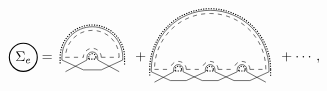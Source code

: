 \documentclass[aps,pra,groupedaddress,twocolumn,notitlepage,superscriptaddress,10pt]{revtex4-1}
\begin{document}
\begin{align}
\tikz[baseline=-0.5ex]{
    \draw[thick] (0,0) circle (10pt) node[anchor=center] {$\Sigma_e$};
    }
=& \ \,
\tikz[scale=0.45,baseline=-0.5ex]{
    \draw[dashed] (0,0) -- (1,0);
    \draw (-0.2,0.)-- (-0.2,-0.15);
    \draw (-0.2,-0.15)-- (1.,-0.7);
    \draw (1.2,-0.15)-- (1.2,0.0);
    \draw (1.2,-0.15)-- (0,-0.8);
    \draw[densely dotted,thick] (-0.3,0.)-- (-0.3,-0.4);
    \draw[densely dotted,thick] (1.3,-0.1)-- (1.3,0.);
    \draw[dashed] (2,0) -- (3,0);
    \draw (1.8,0.)-- (1.8,-0.15);
    \draw (1.8,-0.15)-- (3.,-0.8);
    \draw (3.2,-0.15)-- (3.2,0.);
    \draw (3.2,-0.15)-- (2,-0.7);
    \draw[densely dotted,thick] (1.7,0.)-- (1.7,-0.1);
    \draw[densely dotted,thick] (3.3,-0.4)-- (3.3,0.);
    \draw[densely dotted,thick] (1.3,-0.1)--(1.7,-0.1);
    \draw (1.0,-0.7)-- (2,-0.7);
    \draw[densely dotted,thick] (3.3,0) arc (0:180:1.8);
    \draw[densely dotted,thick] (1.7,0) arc (0:180:0.2);
    \draw[dashed] (2.0,0) arc (0:180:0.5);
    \draw[dashed] (3.0,0) arc (0:180:1.5);
    \draw (1.8,0) arc (0:180:0.3);
    \draw (3.2,0) arc (0:180:1.7);
 }
\ \,
+
\tikz[scale=0.4,baseline=1.5ex]{
    \draw[dashed] (0,0) -- (1,0);
    \draw (-0.2,0.)-- (-0.2,-0.15);
    \draw (-0.2,-0.15)-- (1.,-0.7);
    \draw (1.2,-0.15)-- (1.2,0.0);
    \draw (1.2,-0.15)-- (0,-0.8);
    \draw[densely dotted,thick] (-0.3,0.)-- (-0.3,-0.4);
    \draw[densely dotted,thick] (1.3,-0.1)-- (1.3,0.);
    \draw[dashed] (2,0) -- (3,0);
    \draw (1.8,0.)-- (1.8,-0.15);
    \draw (1.8,-0.15)-- (3.,-0.7);
    \draw (3.2,-0.15)-- (3.2,0.);
    \draw (3.2,-0.15)-- (2,-0.7);
    \draw[densely dotted,thick] (1.7,0.)-- (1.7,-0.1);
    \draw[densely dotted,thick] (3.3,-0.1)-- (3.3,0.);
    \draw[dashed] (4,0) -- (5,0);
    \draw (3.8,0.)-- (3.8,-0.15);
    \draw (3.8,-0.15)-- (5.,-0.7);
    \draw (5.2,-0.15)-- (5.2,0.);
    \draw (5.2,-0.15)-- (4,-0.7);
    \draw[densely dotted,thick] (3.7,0.)-- (3.7,-0.1);
    \draw[densely dotted,thick] (5.3,-0.1)-- (5.3,0.);
    \draw[dashed] (6,0) -- (7,0);
    \draw (5.8,0.)-- (5.8,-0.15);
    \draw (5.8,-0.15)-- (7.,-0.8);
    \draw (7.2,-0.15)-- (7.2,0.);
    \draw (7.2,-0.15)-- (6,-0.7);
    \draw[densely dotted,thick] (5.7,0.)-- (5.7,-0.1);
    \draw[densely dotted,thick] (7.3,-0.4)-- (7.3,0.);
    \draw[densely dotted,thick] (1.3,-0.1)--(1.7,-0.1);
    \draw[densely dotted,thick] (3.3,-0.1)--(3.7,-0.1);
    \draw[densely dotted,thick] (5.3,-0.1)--(5.7,-0.1);
    \draw (1.0,-0.7)-- (2,-0.7);
    \draw (3.0,-0.7)-- (4,-0.7);
    \draw (5.0,-0.7)-- (6,-0.7);
    \draw[densely dotted,thick] (7.3,0) arc (0:180:3.8);
    \draw[densely dotted,thick] (1.7,0) arc (0:180:0.2);
    \draw[densely dotted,thick] (3.7,0) arc (0:180:0.2);
    \draw[densely dotted,thick] (5.7,0) arc (0:180:0.2);
    \draw[dashed] (6.0,0) arc (0:180:0.5);
    \draw[dashed] (4.0,0) arc (0:180:0.5);
    \draw[dashed] (2.0,0) arc (0:180:0.5);
    \draw[dashed] (7.0,0) arc (0:180:3.5);
    \draw (5.8,0) arc (0:180:0.3);
    \draw (3.8,0) arc (0:180:0.3);
    \draw (1.8,0) arc (0:180:0.3);
    \draw (7.2,0) arc (0:180:3.7);
 }
 \ \,
+
\cdots,
\end{align}
\end{document}
